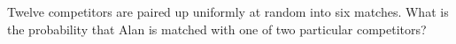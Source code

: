 Twelve competitors are paired up uniformly at random into six matches. What is the probability that Alan is matched with one of two particular competitors?
